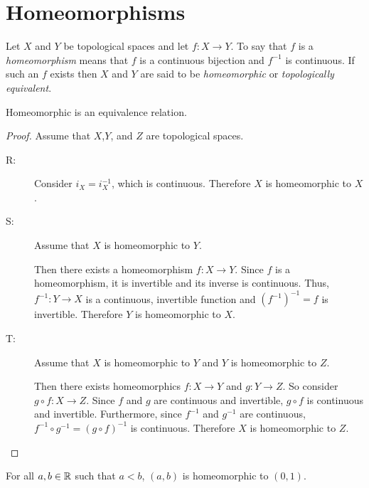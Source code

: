\documentclass[letterpaper,12pt,fleqn]{article}
\begin{document}
\section*{Homeomorphisms}

\begin{definition}[Homeomorphism]
  Let \(X\) and \(Y\) be topological spaces and let \(f:X\to Y\).  To say that \(f\) is a \emph{homeomorphism}
  means that \(f\) is a continuous bijection and \(f^{-1}\) is continuous.  If such an \(f\) exists then \(X\)
  and \(Y\) are said to be \emph{homeomorphic} or \emph{topologically equivalent}.
\end{definition}

\begin{theorem}
  Homeomorphic is an equivalence relation.
\end{theorem}

\begin{proof}
  Assume that \(X\),\(Y\), and \(Z\) are topological spaces.
  \begin{description}
  \item[R:] Consider \(i_X=i_X^{-1}\), which is continuous.  Therefore \(X\) is homeomorphic to \(X\).

  \item[S:] Assume that \(X\) is homeomorphic to \(Y\).

    Then there exists a homeomorphism \(f:X\to Y\).  Since \(f\) is a homeomorphism, it is invertible and its
    inverse is continuous. Thus, \(f^{-1}:Y\to X\) is a continuous, invertible function and \((f^{-1})^{-1}=f\) is
    invertible.  Therefore \(Y\) is homeomorphic to \(X\).

  \item[T:] Assume that \(X\) is homeomorphic to \(Y\) and \(Y\) is homeomorphic to \(Z\).

    Then there exists homeomorphics \(f:X\to Y\) and \(g:Y\to Z\).  So consider \(g\circ f:X\to Z\).  Since \(f\)
    and \(g\) are continuous and invertible, \(g\circ f\) is continuous and invertible.  Furthermore, since
    \(f^{-1}\) and \(g^{-1}\) are continuous, \(f^{-1}\circ g^{-1}=(g\circ f)^{-1}\) is continuous.  Therefore
    \(X\) is homeomorphic to \(Z\).
  \end{description}
\end{proof}

\begin{lemma}
  For all \(a,b\in\mathbb{R}\) such that \(a<b\), \((a,b)\) is homeomorphic to \((0,1)\).
\end{lemma}
\end{document}
